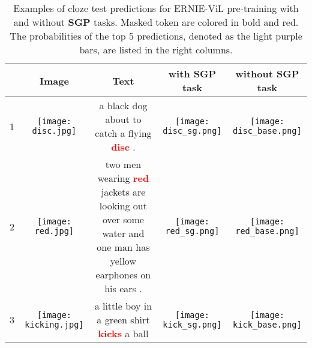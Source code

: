 \documentclass[letterpaper]{article} \usepackage{aaai21}  \usepackage{times}  \usepackage{helvet} \usepackage{courier}  \usepackage[hyphens]{url}  \usepackage{graphicx} \urlstyle{rm} \def\UrlFont{\rm}  \usepackage{natbib}  \usepackage{caption} \frenchspacing  \setlength{\pdfpagewidth}{8.5in}  \setlength{\pdfpageheight}{11in}  \usepackage{cite}
\begin{document}
\begin{table*}[tb]
\centering
\begin{tabular}{ccccc} 
\toprule[0.7pt]
&Image    & Text  & with \textbf{SGP} task  &   without \textbf{SGP} task      \\  
\hline
1&\begin{minipage}{0.20\textwidth}
\texttt{[image: disc.jpg]}
\end{minipage} 
&
 \begin{minipage}{0.20\textwidth}
\small{ a black dog about to catch a flying \textcolor{red}{\textbf{disc}} .}  
\end{minipage}
& 
\begin{minipage}{0.20\textwidth}
\texttt{[image: disc\_sg.png]}
\end{minipage} 
& 
\begin{minipage}{0.20\textwidth}
\texttt{[image: disc\_base.png]}
\end{minipage}
\\



2&\begin{minipage}{0.20\textwidth}
\texttt{[image: red.jpg]}
\end{minipage} 
&
 \begin{minipage}{0.20\textwidth}
\small{two men wearing \textcolor{red}{\textbf{red}} jackets are looking out over some water and one man has yellow earphones on his ears .}  
\end{minipage}
& 
\begin{minipage}{0.20\textwidth}
\texttt{[image: red\_sg.png]}
\end{minipage} 
& 
\begin{minipage}{0.20\textwidth}
\texttt{[image: red\_base.png]}
\end{minipage}
\\

3&\begin{minipage}{0.20\textwidth}
\texttt{[image: kicking.jpg]}
\end{minipage} 
&
 \begin{minipage}{0.20\textwidth}
\small{ a little boy in a green shirt \textcolor{red}{\textbf{kicks}} a ball}  
\end{minipage}
& 
\begin{minipage}{0.20\textwidth}
\texttt{[image: kick\_sg.png]}
\end{minipage} 
& 
\begin{minipage}{0.20\textwidth}
\texttt{[image: kick\_base.png]}
\end{minipage}
\\

\bottomrule[0.8pt]
\end{tabular}
\caption{Examples of cloze test predictions for ERNIE-ViL pre-training with and without \textbf{SGP} tasks. Masked token are colored in bold and red. The probabilities of the top 5 predictions, denoted as the light purple bars, are listed in the right columns.}
\label{tab_cloze}
\end{table*}
\end{document}
